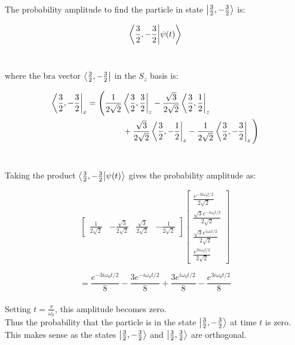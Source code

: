 \documentclass[14pt]{extarticle}
\begin{document}
The probability amplitude to find the particle in state $\ket{\frac 32, -\frac 32}$ is:

$$\bra{\frac 32, -\frac 32}\ket{\psi(t)}$$ \ 

where the bra vector $\bra{\frac 32, -\frac 32}$ in the $S_z$ basis is:

$$
\begin{aligned}
	\bra{\frac 32, -\frac 32}_x &= \Bigg( \frac{1}{2\sqrt 2} \bra{\frac 32, \frac 32}_z - \frac{\sqrt 3}{2\sqrt 2} \bra{\frac 32, \frac 12}_z \\ 
	&\hspace{1.5cm}+ \frac{\sqrt 3}{2\sqrt 2} \bra{\frac 32, -\frac 12}_z - \frac{1}{2\sqrt 2}\bra{\frac 32, -\frac 32}_z \Bigg)
\end{aligned}
$$ \ 

Taking the product $\bra{\frac 32, -\frac 32}\ket{\psi(t)}$ gives the probability amplitude as:

$$
\begin{bmatrix}
	\frac{1}{2\sqrt 2}  & -\frac{\sqrt 3}{2\sqrt 2} & \frac{\sqrt 3}{2\sqrt 2} & -\frac{1}{2\sqrt 2}  
\end{bmatrix}
\begin{bmatrix}
	\frac{e^{-3i \omega_0 t / 2}}{2\sqrt 2} \\ 
	\frac{\sqrt 3 e^{-i \omega_0 t / 2}}{2\sqrt 2} \\ 
	\frac{\sqrt 3 e^{i \omega_0 t / 2}}{2\sqrt 2} \\ 	
	\frac{e^{3i \omega_0 t / 2}}{2\sqrt 2}
\end{bmatrix}
$$

$$= \frac{e^{-3i \omega_0 t / 2}}{8} - \frac{3e^{-i \omega_0 t / 2}}{8} + \frac{3e^{i \omega_0 t / 2}}{8} - \frac{e^{3i \omega_0 t / 2}}{8}$$ \\ 
 
Setting $t = \frac{\pi}{\omega_0}$, this amplitude becomes zero. \\ 

Thus the probability that the particle is in the state $\ket{\frac 32, -\frac 32}$ at time $t$ is zero. This makes sense as the states $\ket{\frac 32, -\frac 32}$ and $\ket{\frac 32, \frac 32}$ are orthogonal.  
\end{document}
